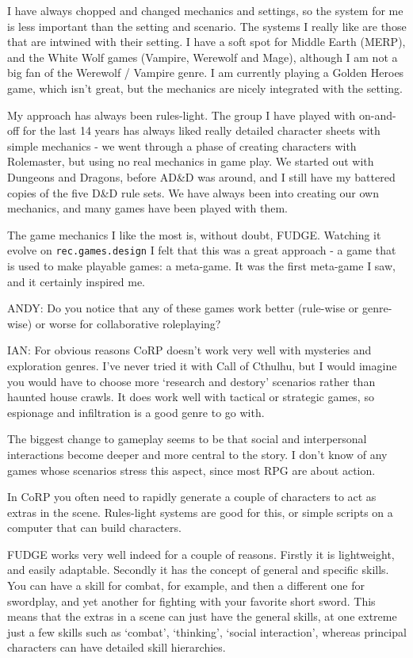 \documentclass[twoside]{book}
\begin{document}
\begin{description}
I have always chopped and changed mechanics and settings, so the system for me is less important than the setting and scenario. The systems I really like are those that are intwined with their setting. I have a soft spot for Middle Earth (MERP), and the White Wolf games (Vampire, Werewolf and Mage), although I am not a big fan of the Werewolf / Vampire genre. I am currently playing a Golden Heroes game, which isn't great, but the mechanics are nicely integrated with the setting.

My approach has always been rules-light. The group I have played with on-and-off for the last 14 years has always liked really detailed character sheets with simple mechanics - we went through a phase of creating characters with Rolemaster, but using no real mechanics in game play. We started out with Dungeons and Dragons, before AD\&D was around, and I still have my battered copies of the five D\&D rule sets. We have always been into creating our own mechanics, and many games have been played with them.

The game mechanics I like the most is, without doubt, FUDGE. Watching it evolve on {\tt rec.games.design} I felt that this was a great approach - a game that is used to make playable games: a meta-game. It was the first meta-game I saw, and it certainly inspired me.

\item{ANDY:} Do you notice that any of these games work better (rule-wise or genre-wise) or worse for collaborative roleplaying?

\item{IAN:} For obvious reasons CoRP doesn't work very well with mysteries and exploration genres. I've never tried it with Call of Cthulhu, but I would imagine you would have to choose more `research and destory' scenarios rather than haunted house crawls. It does work well with tactical or strategic games, so espionage and infiltration is a good genre to go with.

The biggest change to gameplay seems to be that social and interpersonal interactions become deeper and more central to the story. I don't know of any games whose scenarios stress this aspect, since most RPG are about action.

In CoRP you often need to rapidly generate a couple of characters to act as extras in the scene. Rules-light systems are good for this, or simple scripts on a computer that can build characters.

FUDGE works very well indeed for a couple of reasons. Firstly it is lightweight, and easily adaptable. Secondly it has the concept of general and specific skills. You can have a skill for combat, for example, and then a different one for swordplay, and yet another for fighting with your favorite short sword. This means that the extras in a scene can just have the general skills, at one extreme just a few skills such as `combat', `thinking', `social interaction', whereas principal characters can have detailed skill hierarchies.


\end{description}
\end{document}
